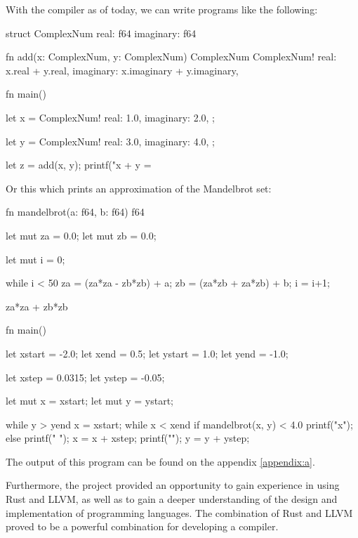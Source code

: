 ﻿\documentclass[10pt,a4paper,twocolumn,twoside]{article}
\begin{document}
With the compiler as of today, we can write programs like the following:

\begin{code}
struct ComplexNum {
    real:      f64
    imaginary: f64
}

fn add(x: ComplexNum, y: ComplexNum) ComplexNum {
    ComplexNum!{
        real: x.real + y.real,
        imaginary: x.imaginary + y.imaginary,
    }
}

fn main() {
    let x = ComplexNum!{
        real: 1.0,
        imaginary: 2.0,
    };

    let y = ComplexNum!{
        real: 3.0,
        imaginary: 4.0,
    };

    let z = add(x, y);
    printf("x + y = %
}
\end{code}

Or this which prints an approximation of the Mandelbrot set:
\newpage

\begin{code}
fn mandelbrot(a: f64, b: f64) f64 {
    let mut za = 0.0;
    let mut zb = 0.0;

    let mut i = 0;

    while i < 50 {
        za = (za*za - zb*zb) + a;
        zb = (za*zb + za*zb) + b;
        i = i+1;
    }

    za*za + zb*zb
}

fn main() {
    let xstart = -2.0;
    let xend = 0.5;
    let ystart = 1.0;
    let yend = -1.0;

    let xstep = 0.0315;
    let ystep = -0.05;

    let mut x = xstart;
    let mut y = ystart;

    while y > yend {
        x = xstart;
        while x < xend {
            if mandelbrot(x, y) < 4.0 {
                printf("x");
            } else {
                printf(" ");
            }
            x = x + xstep; 
        }
        printf("\n");
        y = y + ystep;
    }
}
\end{code}

The output of this program can be found on the appendix \ref{appendix:a}.

Furthermore, the project provided an opportunity to gain experience in using
Rust and LLVM, as well as to gain a deeper understanding of the design and
implementation of programming languages. The combination of Rust and LLVM proved
to be a powerful combination for developing a compiler.
\end{document}
